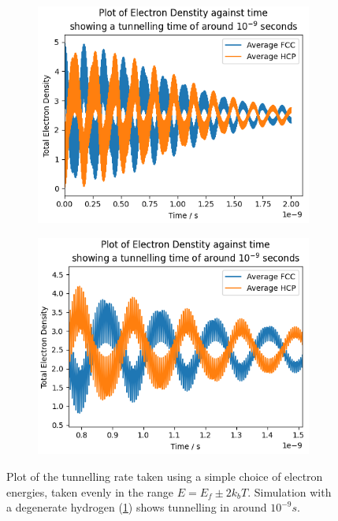 \begin{figure}[htbp]
    \captionsetup[subfigure]{justification=centering}
    \centering
    \begin{subfigure}{0.45\linewidth}
        \includegraphics[width=0.9\linewidth]{Figures/Simulation/Plot of large band simulation decay times.png}
        \label{fig:large band degenerate simulation}
    \end{subfigure}
    \begin{subfigure}{0.45\linewidth}
        \includegraphics[width=0.9\linewidth]{Figures/Simulation/Plot of large band simulation decay times rapid oscillations.png }
    \end{subfigure}
    \caption{Plot of the tunnelling rate taken using a
        simple choice of electron energies,
        taken evenly in the range \(E=E_f \pm 2 k_b T\).
        Simulation with a degenerate hydrogen
        (\cref{fig:large band degenerate simulation})
        shows tunnelling in around
        \(10^{-9}s\).
    }\label{fig:tunnelling rate single large band}
\end{figure}

